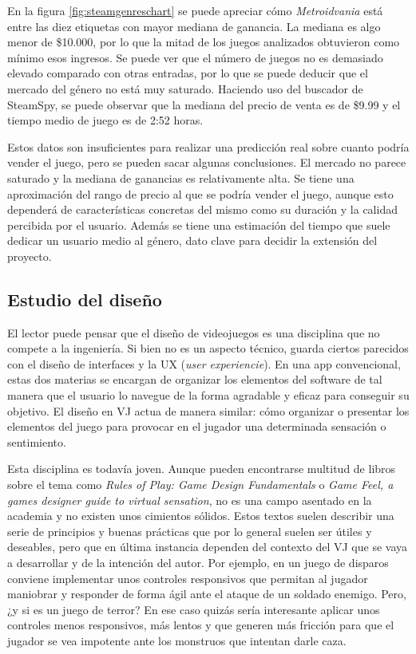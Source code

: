 En la figura \ref{fig:steamgenreschart} se puede apreciar cómo \textit{Metroidvania} está entre las diez etiquetas con mayor mediana de ganancia. La mediana es algo menor de \$10.000, por lo que la mitad de los juegos analizados obtuvieron como mínimo esos ingresos. Se puede ver que el número de juegos no es demasiado elevado comparado con otras entradas, por lo que se puede deducir que el mercado del género no está muy saturado. Haciendo uso del buscador de SteamSpy, se puede observar que la mediana del precio de venta es de \$9.99 y el tiempo medio de juego es de 2:52 horas.

Estos datos son insuficientes para realizar una predicción real sobre cuanto podría vender el juego, pero se pueden sacar algunas conclusiones. El mercado no parece saturado y la mediana de ganancias es relativamente alta. Se tiene una aproximación del rango de precio al que se podría vender el juego, aunque esto dependerá de características concretas del mismo como su duración y la calidad percibida por el usuario. Además se tiene una estimación del tiempo que suele dedicar un usuario medio al género, dato clave para decidir la extensión del proyecto.

\subsection{Estudio del diseño}

El lector puede pensar que el diseño de videojuegos es una disciplina que no compete a la ingeniería. Si bien no es un aspecto técnico, guarda ciertos parecidos con el diseño de interfaces y la UX (\textit{user experiencie}). En una app convencional, estas dos materias se encargan de organizar los elementos del software de tal manera que el usuario lo navegue de la forma agradable y eficaz para conseguir su objetivo. El diseño en VJ actua de manera similar: cómo organizar o presentar los elementos del juego para provocar en el jugador una determinada sensación o sentimiento.

Esta disciplina es todavía joven. Aunque pueden encontrarse multitud de libros sobre el tema como \textit{Rules of Play: Game Design Fundamentals}\cite{rules-of-play} o \textit{Game Feel, a games designer guide to virtual sensation}\cite{gamefeel}, no es una campo asentado en la academia y no existen unos cimientos sólidos. Estos textos suelen describir una serie de principios y buenas prácticas que por lo general suelen ser útiles y deseables, pero que en última instancia dependen del contexto del VJ que se vaya a desarrollar y de la intención del autor. Por ejemplo, en un juego de disparos conviene implementar unos controles responsivos que permitan al jugador maniobrar y responder de forma ágil ante el ataque de un soldado enemigo. Pero, ¿y si es un juego de terror? En ese caso quizás sería interesante aplicar unos controles menos responsivos, más lentos y que generen más fricción para que el jugador se vea impotente ante los monstruos que intentan darle caza.

